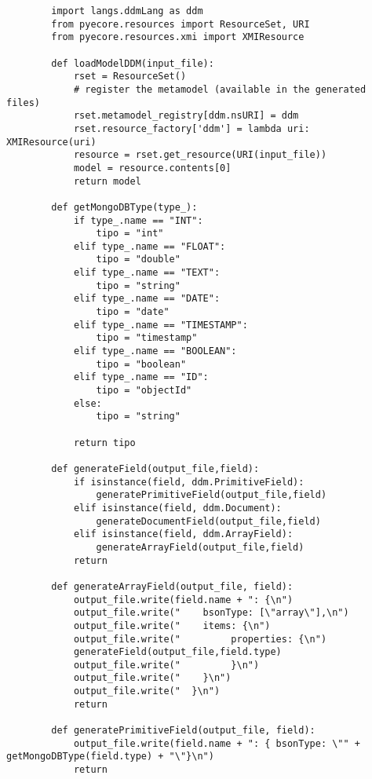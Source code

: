   \begin{code}
    \label{code:er-to-gdm}
    \begin{verbatim}
        import langs.ddmLang as ddm
        from pyecore.resources import ResourceSet, URI
        from pyecore.resources.xmi import XMIResource
        
        def loadModelDDM(input_file):
            rset = ResourceSet()
            # register the metamodel (available in the generated files)
            rset.metamodel_registry[ddm.nsURI] = ddm
            rset.resource_factory['ddm'] = lambda uri: XMIResource(uri)  
            resource = rset.get_resource(URI(input_file))
            model = resource.contents[0]
            return model
        
        def getMongoDBType(type_):
            if type_.name == "INT":
                tipo = "int"
            elif type_.name == "FLOAT":
                tipo = "double"
            elif type_.name == "TEXT":
                tipo = "string"
            elif type_.name == "DATE":
                tipo = "date"
            elif type_.name == "TIMESTAMP":
                tipo = "timestamp"
            elif type_.name == "BOOLEAN":
                tipo = "boolean"
            elif type_.name == "ID":
                tipo = "objectId"
            else:
                tipo = "string"
        
            return tipo
        
        def generateField(output_file,field):
            if isinstance(field, ddm.PrimitiveField):
                generatePrimitiveField(output_file,field)
            elif isinstance(field, ddm.Document):
                generateDocumentField(output_file,field)
            elif isinstance(field, ddm.ArrayField):
                generateArrayField(output_file,field)
            return
        
        def generateArrayField(output_file, field):
            output_file.write(field.name + ": {\n")
            output_file.write("    bsonType: [\"array\"],\n")
            output_file.write("    items: {\n")
            output_file.write("         properties: {\n")
            generateField(output_file,field.type)
            output_file.write("         }\n")
            output_file.write("    }\n")
            output_file.write("  }\n")
            return
        
        def generatePrimitiveField(output_file, field):
            output_file.write(field.name + ": { bsonType: \"" + getMongoDBType(field.type) + "\"}\n")
            return
        

\end{verbatim}
\end{code}
